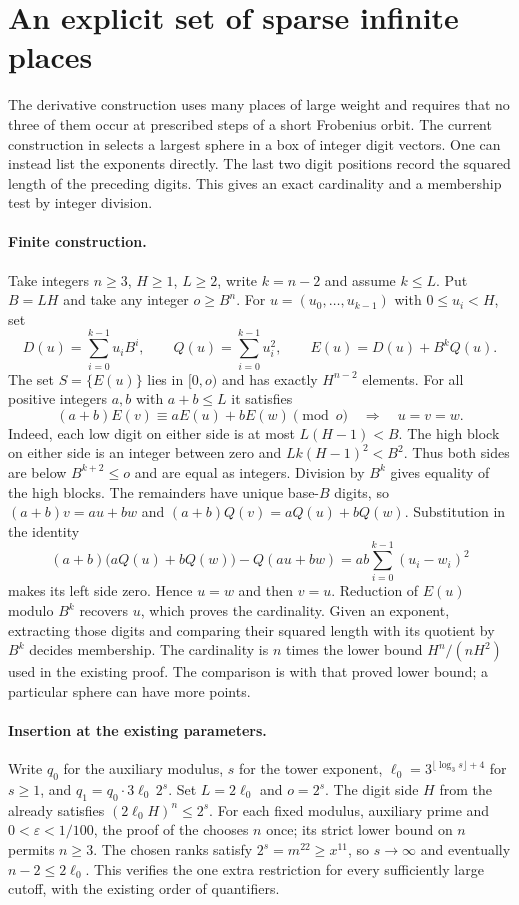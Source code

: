 \section{An explicit set of sparse infinite places}
\label{sec:paraboloid}

The derivative construction uses many places of large weight and requires that no three
of them occur at prescribed steps of a short Frobenius orbit. The current construction
in  selects a largest sphere in a box of
integer digit vectors. One can instead list the exponents directly. The last two
digit positions record the squared length of the preceding digits. This gives an
exact cardinality and a membership test by integer division.

\paragraph{Finite construction.}
Take integers $n\ge3$, $H\ge1$, $L\ge2$, write $k=n-2$ and assume
$k\le L$. Put $B=LH$ and take any integer $o\ge B^n$. For
$u=(u_0,\ldots,u_{k-1})$ with $0\le u_i<H$, set
\[
  D(u)=\sum_{i=0}^{k-1}u_i B^i,\qquad
  Q(u)=\sum_{i=0}^{k-1}u_i^2,\qquad
  E(u)=D(u)+B^kQ(u).
\]
The set $S=\{E(u)\}$ lies in $[0,o)$ and has exactly $H^{n-2}$ elements.
For all positive integers $a,b$ with $a+b\le L$ it satisfies
\[
 (a+b)E(v)\equiv aE(u)+bE(w)\pmod o
        \quad\Longrightarrow\quad u=v=w .
\]
Indeed, each low digit on either side is at most $L(H-1)<B$.
The high block on either side is an integer between zero and
$Lk(H-1)^2<B^2$. Thus both sides are below $B^{k+2}\le o$ and are equal
as integers. Division by $B^k$ gives equality of the high blocks.
The remainders have unique base-$B$ digits, so
$(a+b)v=au+bw$ and $(a+b)Q(v)=aQ(u)+bQ(w)$. Substitution in the identity
\[
  (a+b)\bigl(aQ(u)+bQ(w)\bigr)-Q(au+bw)
        =ab\sum_{i=0}^{k-1}(u_i-w_i)^2
\]
makes its left side zero. Hence $u=w$ and then $v=u$.
Reduction of $E(u)$ modulo $B^k$ recovers $u$, which proves the cardinality.
Given an exponent, extracting those digits and comparing their squared length
with its quotient by $B^k$ decides membership. The cardinality is $n$ times
the lower bound $H^n/(nH^2)$ used in the existing proof. The comparison is with
that proved lower bound; a particular sphere can have more points.

\paragraph{Insertion at the existing parameters.}
Write $q_0$ for the auxiliary modulus, $s$ for the tower exponent,
$\ell_0=3^{\lfloor\log_3s\rfloor+4}$ for $s\ge1$, and
$q_1=q_0\cdot3\ell_0\,2^s$. Set $L=2\ell_0$ and $o=2^s$.
The digit side $H$ from the  already satisfies
$(2\ell_0 H)^n\le2^s$. For each fixed modulus, auxiliary prime and
$0<\varepsilon<1/100$, the proof of
the  chooses $n$ once;
its strict lower bound on $n$ permits $n\ge3$. The chosen ranks satisfy
$2^s=m^{22}\ge x^{11}$, so $s\to\infty$ and eventually
$n-2\le2\ell_0$. This verifies the one extra restriction for every
sufficiently large cutoff, with the existing order of quantifiers.

